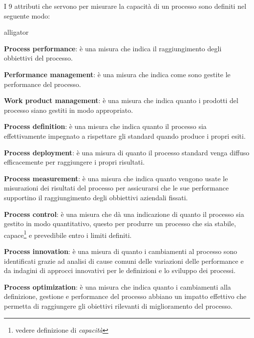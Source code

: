 I 9 attributi che servono per misurare la capacità di un processo sono definiti nel seguente modo:
\begin{labeling}{alligator}
	\item \textbf{Process performance}:  è una misura che indica il raggiungimento degli obbiettivi del processo.
	\item \textbf{Performance management}: è una misura che indica come sono gestite le performance del processo.%
	\item \textbf{Work product management}: è una misura che indica quanto i prodotti del processo siano gestiti in modo appropriato.
	\item \textbf{Process definition}: è una misura che indica quanto il processo sia effettivamente impegnato a rispettare gli standard quando produce i propri esiti.
	\item \textbf{Process deployment}: è una misura di quanto il processo standard venga diffuso efficacemente per raggiungere i propri risultati.%
	\item \textbf{Process measurement}:  è una misura che indica quanto vengono usate le misurazioni dei risultati  del processo per assicurarsi che le sue  performance supportino il raggiungimento degli obbiettivi aziendali fissati.
	\item \textbf{Process control}:  è una misura che dà una indicazione di quanto il processo sia gestito in modo quantitativo, questo per produrre un processo che sia stabile, capace\footnote{vedere definizione di \emph{capacità}} e prevedibile entro i limiti definiti.%
	\item \textbf{Process innovation}: è una misura di quanto i cambiamenti al processo sono identificati grazie ad analisi di cause comuni delle variazioni delle performance e da indagini di approcci innovativi per le definizioni e lo sviluppo dei processi.%
	\item \textbf{Process optimization}: è una misura che indica quanto i cambiamenti alla definizione, gestione e performance del processo abbiano un impatto effettivo che permetta di raggiungere gli obiettivi rilevanti di miglioramento del processo.%
\end{labeling}

